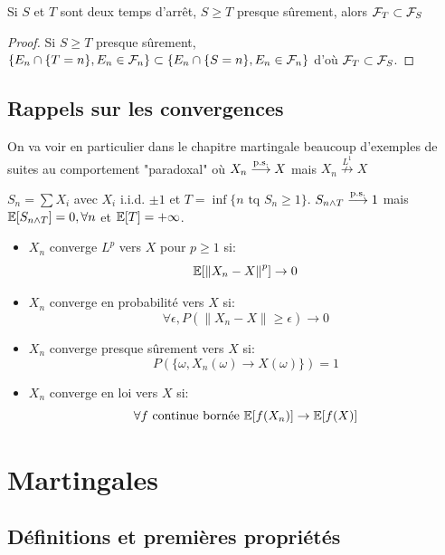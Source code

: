 \documentclass[]{report}
\begin{document}
    \begin{prop}{}{}
        Si $S$ et $T$ sont deux temps d'arrêt, $S\ge T$ presque sûrement, alors $\mathcal{F}_T\subset \mathcal{F}_S$
    \end{prop}

    \begin{proof}
        Si $S\ge T$ presque sûrement, $\{E_n\cap\{T=n\},E_n\in \mathcal{F}_n\}\subset \{E_n\cap\{S=n\},E_n\in \mathcal{F}_n\}$ d'où $\mathcal{F}_T\subset \mathcal{F}_S$.
    \end{proof}

    \section{Rappels sur les convergences}

    \danger \quad On va voir en particulier dans le chapitre martingale beaucoup d'exemples de suites au comportement "paradoxal" où $X_n\overset{\text{p.s.}}{\longrightarrow} X$ mais $X_n \overset{L^1}{\not\longrightarrow} X$

    \begin{ex}{}{}
        $S_n=\sum X_i$ avec $X_i$ i.i.d. $\pm 1$ et $T=\inf\{n\text{ tq }S_n\ge 1\}$. $S_{n\land T}\overset{\text{p.s.}}{\longrightarrow} 1$ mais $\mathbb{E}[S_{n\land T}]=0,\forall n$ et $\mathbb{E}[T]=+\infty$.
    \end{ex}

    \begin{df}{}{}
        \begin{itemize}
            \item $X_n$ converge $L^p$ vers $X$ pour $p\ge 1$ si:
            \[\mathbb{E}[\left\| X_n-X\right\|^p]\to 0\]
            \item $X_n$ converge en probabilité vers $X$ si:
            \[\forall \epsilon, P(\left\|X_n-X\right\|\ge \epsilon)\to 0\]
            \item $X_n$ converge presque sûrement vers $X$ si:
            \[P(\{\omega,X_n(\omega)\to X(\omega)\})=1\]
            \item $X_n$ converge en loi vers $X$ si:
            \[\forall f\text{ continue bornée }\mathbb{E}[f(X_n)]\to \mathbb{E}[f(X)]\]
        \end{itemize}
    \end{df}

    \chapter{Martingales}

    \section{Définitions et premières propriétés}
\end{document}

